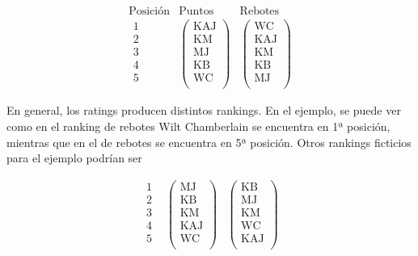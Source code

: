 \begin{ejemplo}
\[
\begin{array}{ccc}
\text{Posición} & \text{Puntos} & \text{Rebotes}\\ 
\begin{array}{c}
\text{1}\\
\text{2}\\
\text{3}\\
\text{4}\\
\text{5}\\
\end{array} & \left(\begin{array}{c}
\text{KAJ}\\
\text{KM}\\
\text{MJ}\\
\text{KB}\\
\text{WC}\\
\end{array} \right) & \left(\begin{array}{c}
\text{WC}\\
\text{KAJ}\\
\text{KM}\\
\text{KB}\\
\text{MJ}\\
\end{array} \right)
\end{array}
\]

En general, los ratings producen distintos rankings. En el ejemplo, se puede ver como en el ranking de rebotes Wilt Chamberlain se encuentra en 1ª posición, mientras que en el de rebotes se encuentra en 5ª posición. Otros rankings ficticios para el ejemplo podrían ser

\[
\begin{array}{ccc}
\begin{array}{c}
\text{1}\\
\text{2}\\
\text{3}\\
\text{4}\\
\text{5}\\
\end{array} & \left(\begin{array}{c}
\text{MJ}\\
\text{KB}\\
\text{KM}\\
\text{KAJ}\\
\text{WC}\\
\end{array} \right) & \left(\begin{array}{c}
\text{KB}\\
\text{MJ}\\
\text{KM}\\
\text{WC}\\
\text{KAJ}\\
\end{array} \right)
\end{array}
\]

\end{ejemplo}

